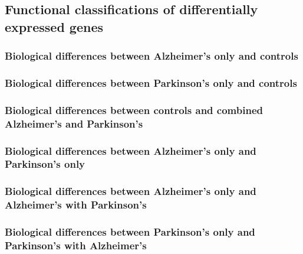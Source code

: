 \subsection{Functional classifications of differentially expressed genes}
\label{subsec:funct-class-diff}

\subsubsection{Biological differences between Alzheimer's only and controls}
\label{subsubsec:biol-diff-betw}

\subsubsection{Biological differences between Parkinson's only and controls}
\label{subsubsec:biol-diff-betw-1}

\subsubsection{Biological differences between controls and combined Alzheimer's and Parkinson's}
\label{subsubsec:biol-diff-betw-2}

\subsubsection{Biological differences between Alzheimer's only and Parkinson's only}
\label{subsubsec:biol-diff-betw-3}

\subsubsection{Biological differences between Alzheimer's only and Alzheimer's with Parkinson's}
\label{subsubsec:biol-diff-betw-4}

\subsubsection{Biological differences between Parkinson's only and Parkinson's with Alzheimer's}
\label{subsubsec:biol-diff-betw-5}

\pagebreak







